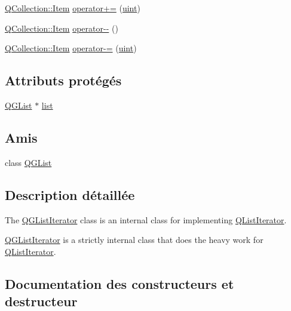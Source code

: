 \begin{DoxyCompactItemize}
\hyperlink{class_q_collection_ac6f3ddbf999e31fb797927f71ae6b5d7}{Q\+Collection\+::\+Item} \hyperlink{class_q_g_list_iterator_a291ca7794aaf9b6ac8621bcbdd7b866c}{operator+=} (\hyperlink{qglobal_8h_a4d3943ddea65db7163a58e6c7e8df95a}{uint})
\item 
\hyperlink{class_q_collection_ac6f3ddbf999e31fb797927f71ae6b5d7}{Q\+Collection\+::\+Item} \hyperlink{class_q_g_list_iterator_a4a907a254a5e31214aad4f46d0333915}{operator-\/-\/} ()
\item 
\hyperlink{class_q_collection_ac6f3ddbf999e31fb797927f71ae6b5d7}{Q\+Collection\+::\+Item} \hyperlink{class_q_g_list_iterator_aa751103a7fcd16685a78f7272720217f}{operator-\/=} (\hyperlink{qglobal_8h_a4d3943ddea65db7163a58e6c7e8df95a}{uint})
\end{DoxyCompactItemize}
\subsection*{Attributs protégés}
\begin{DoxyCompactItemize}
\item 
\hyperlink{class_q_g_list}{Q\+G\+List} $\ast$ \hyperlink{class_q_g_list_iterator_a6e606950ab50b273e8370d9e24756bf2}{list}
\end{DoxyCompactItemize}
\subsection*{Amis}
\begin{DoxyCompactItemize}
\item 
class \hyperlink{class_q_g_list_iterator_a9bfde3c3259271cb86b87bd78b399dd5}{Q\+G\+List}
\end{DoxyCompactItemize}


\subsection{Description détaillée}
The \hyperlink{class_q_g_list_iterator}{Q\+G\+List\+Iterator} class is an internal class for implementing \hyperlink{class_q_list_iterator}{Q\+List\+Iterator}. 

\hyperlink{class_q_g_list_iterator}{Q\+G\+List\+Iterator} is a strictly internal class that does the heavy work for \hyperlink{class_q_list_iterator}{Q\+List\+Iterator}. 

\subsection{Documentation des constructeurs et destructeur}
\hypertarget{class_q_g_list_iterator_a587dd0b283af87ffb8df810f5206cd02}{}
